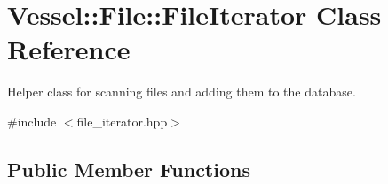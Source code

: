 \hypertarget{class_vessel_1_1_file_1_1_file_iterator}{}\section{Vessel\+:\+:File\+:\+:File\+Iterator Class Reference}
\label{class_vessel_1_1_file_1_1_file_iterator}


Helper class for scanning files and adding them to the database.  




{\ttfamily \#include $<$file\+\_\+iterator.\+hpp$>$}

\subsection*{Public Member Functions}

